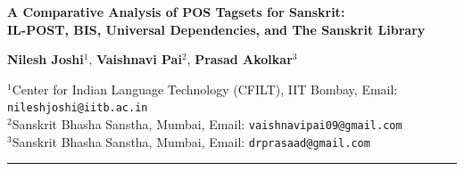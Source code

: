 \documentclass[11pt,a4paper]{article}
\begin{document}
\begin{center}
    {\LARGE \bfseries \color{navyblue} A Comparative Analysis of POS Tagsets for Sanskrit:\\[0.3em] IL-POST, BIS, Universal Dependencies, and The Sanskrit Library \par}
    \vspace{1.5em}
    
    {\large \textbf{Nilesh Joshi}$^1$, \textbf{Vaishnavi Pai}$^2$, \textbf{Prasad Akolkar}$^3$} \par
    \vspace{0.8em}
    $^1$Center for Indian Language Technology (CFILT), IIT Bombay, Email: \texttt{nileshjoshi@iitb.ac.in} \\
    $^2$Sanskrit Bhasha Sanstha, Mumbai, Email: \texttt{vaishnavipai09@gmail.com} \\
    $^3$Sanskrit Bhasha Sanstha, Mumbai, Email: \texttt{drprasaad@gmail.com} \par
    \vspace{1.2em}
\end{center}

\rule{\textwidth}{0.8pt}
\end{document}

